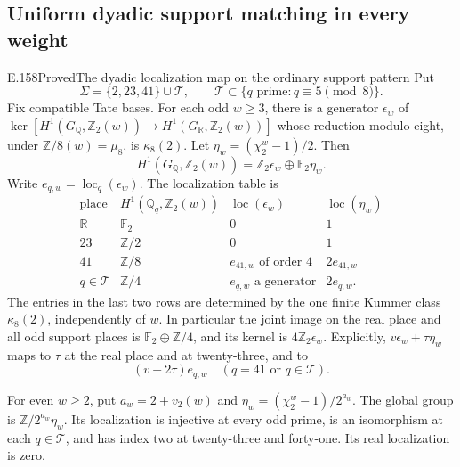 \subsection{Uniform dyadic support matching in every weight}

\begin{result}{E.158}{Proved}{The dyadic localization map on the ordinary support pattern}
Put
\[
 \Sigma=\{2,23,41\}\cup\mathcal T,\qquad
 \mathcal T\subset\{q\text{ prime}:q\equiv5\pmod8\}.
 \tag{E.158.1}
\]
Fix compatible Tate bases. For each odd \(w\ge3\), there is a
generator \(\epsilon_w\) of
\(\ker[H^1(G_{\mathbb Q},\mathbb Z_2(w))
\to H^1(G_{\mathbb R},\mathbb Z_2(w))]\)
whose reduction modulo eight, under
\(\mathbb Z/8(w)=\mu_8\), is \(\kappa_8(2)\).
Let \(\eta_w=(\chi_2^w-1)/2\). Then
\[
 H^1(G_{\mathbb Q},\mathbb Z_2(w))
       =\mathbb Z_2\epsilon_w\oplus\mathbb F_2\eta_w.
 \tag{E.158.2}
\]
Write \(e_{q,w}=\operatorname{loc}_q(\epsilon_w)\). The
localization table is
\[
\begin{array}{c|c|c|c}
 \text{place}&H^1(\mathbb Q_q,\mathbb Z_2(w))
     &\operatorname{loc}(\epsilon_w)&\operatorname{loc}(\eta_w)\\\hline
 \mathbb R&\mathbb F_2&0&1\\
 23&\mathbb Z/2&0&1\\
 41&\mathbb Z/8&e_{41,w}\text{ of order }4&2e_{41,w}\\
 q\in\mathcal T&\mathbb Z/4&e_{q,w}\text{ a generator}&2e_{q,w}.
\end{array}
\tag{E.158.3}
\]
The entries in the last two rows are determined by the one
finite Kummer class \(\kappa_8(2)\), independently of \(w\).
In particular the joint image on the real place and all odd
support places is \(\mathbb F_2\oplus\mathbb Z/4\), and its
kernel is \(4\mathbb Z_2\epsilon_w\). Explicitly,
\(v\epsilon_w+\tau\eta_w\) maps to \(\tau\) at the real place
and at twenty-three, and to
\[
                     (v+2\tau)e_{q,w}
              \quad(q=41\text{ or }q\in\mathcal T).
 \tag{E.158.4}
\]

For even \(w\ge2\), put \(a_w=2+v_2(w)\) and
\(\eta_w=(\chi_2^w-1)/2^{a_w}\). The global group is
\(\mathbb Z/2^{a_w}\eta_w\). Its localization is injective
at every odd prime, is an isomorphism at each
\(q\in\mathcal T\), and has index two at twenty-three
and forty-one. Its real localization is zero.
\end{result}
